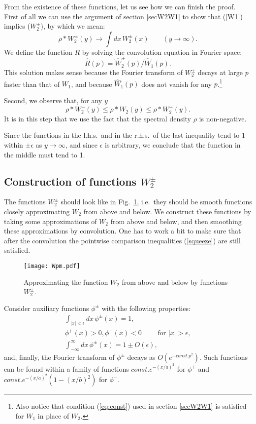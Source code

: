 \documentclass[12pt]{article}
\newcommand{\reef}[1]{(\ref{#1})}
\def\eps{\epsilon}
\newcommand{\beq}{\begin{equation}}
\newcommand{\eeq}{\end{equation}}
\def\le{\leqslant}
\def\eps{\epsilon}
\numberwithin{equation}{section}
\begin{document}
From the existence of these functions, let us see how we can finish the proof.
First of all we can use the argument of section \ref{secW2W1} to show that \reef{W1} implies ($W_2^\pm$), by which we mean:
\beq
\rho* W_2^\pm(y)\to \int dx\,W_2^\pm(x)\qquad(y\to\infty).
\eeq
We define the function $R$ by solving the convolution equation in Fourier space:
\beq
\label{Rpm}
\hat R(p) = \hat W_2^\pm(p)/\hat W_1(p).
\eeq 
This solution makes sense because the Fourier transform of $W_2^\pm$ decays at large $p$ faster than that of $W_1$, and because $\hat W_1(p)$ does not vanish for any $p$.\footnote{Also notice that condition \reef{eq:const} used in section \ref{secW2W1} is satisfied for $W_1$ in place of $W_2$.}

Second, we observe that, for any $y$
\beq
\label{rhocomp}
\rho* W_2^-(y) \le \rho* W_2(y) \le \rho* W_2^+(y).
\eeq
It is in this step that we use the fact that the spectral density $\rho$ is non-negative.

Since the functions in the l.h.s.~and in the r.h.s.~of the last inequality tend to 1 within $\pm\eps$ as $y\to\infty$,
and since $\eps$ is arbitrary, we conclude that the function in the middle must tend to 1. 

\subsection{Construction of functions $W_2^{\pm}$}

The functions $W_2^\pm$ should look like in Fig.~\ref{Wpm}, i.e.~they should be smooth functions closely approximating $W_2$ from above and below. We construct these functions by taking some approximations of $W_2$ from above and below, and then smoothing these approximations by convolution. One has to work a bit to make sure that after the convolution the pointwise comparison inequalities \reef{squeeze} are still satisfied.

\begin{figure}
\centering
\texttt{[image: Wpm.pdf]}
\caption{Approximating the function $W_2$ from above and below by functions $W_2^\pm$.}
\label{Wpm}
\end{figure}

Consider auxiliary functions $\phi^\pm$ with the following properties:
\begin{gather}
\int_{|x|<\eps} dx\,\phi^\pm (x)=1,
\label{intphi1}\\
\phi^+(x)>0,\phi^-(x)<0\qquad \text{ for }|x|>\eps,
\label{tailphi}\\
\int_{-\infty}^\infty dx\,\phi^\pm(x)=1\pm O(\eps),
\end{gather}
and, finally, the Fourier transform of $\phi^\pm$ decays as $O(e^{-const.p^2})$. 
Such functions can be found within a family of functions $const. e^{-(x/a)^2}$ for $\phi^+$ and
$const. e^{-(x/a)^2}(1-(x/b)^2)$ for $\phi^-$.
\end{document}
